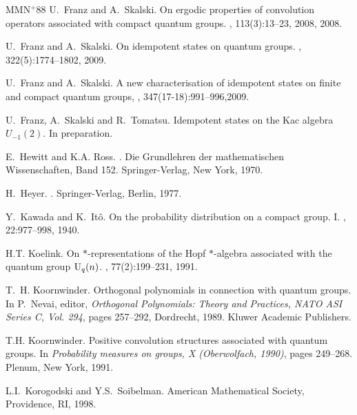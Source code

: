 \documentclass[12pt]{amsart}
\theoremstyle{definition}
\theoremstyle{remark}
\numberwithin{equation}{section}
\begin{document}
\begin{thebibliography}{MMN{{$^{{+}}$}}88}
U.~Franz and A.~Skalski.
\newblock On ergodic properties of convolution operators associated with
  compact quantum groups.
, 113(3):13--23, 2008,
  2008.

U.~Franz and A.~Skalski.
\newblock On idempotent states on quantum groups.
,  322(5):1774--1802, 2009.

U.~Franz and A.~Skalski.
\newblock A new characterisation of idempotent states on finite and compact quantum groups,
, 347(17-18):991--996,2009.

U.~Franz, A.~Skalski and R.~Tomatsu.
\newblock Idempotent states on the Kac algebra $U_{-1}(2)$.
\newblock In preparation.

E.~Hewitt and K.A. Ross.
.
\newblock Die Grundlehren der mathematischen Wissenschaften, Band 152.
  Springer-Verlag, New York, 1970.

H.~Heyer.
.
\newblock Springer-Verlag, Berlin, 1977.

Y.~Kawada and K.~It{\^o}.
\newblock On the probability distribution on a compact group. {I}.
, 22:977--998, 1940.

H.T. Koelink.
\newblock On {$*$}-representations of the {H}opf {$*$}-algebra associated with
  the quantum group {${\rm U}\sb q(n)$}.
, 77(2):199--231, 1991.

T.~H. Koornwinder.
\newblock Orthogonal polynomials in connection with quantum groups.
\newblock In P.~Nevai, editor, {\em Orthogonal Polynomials: Theory and
  Practices, NATO ASI Series C, Vol. 294}, pages 257--292, Dordrecht, 1989.
  Kluwer Academic Publishers.

T.H. Koornwinder.
\newblock Positive convolution structures associated with quantum groups.
\newblock In {\em Probability measures on groups, {X} ({O}berwolfach, 1990)},
  pages 249--268. Plenum, New York, 1991.

L.I.~Korogodski and Y.S.~Soibelman.   American Mathematical Society, Providence, RI, 1998.


\end{thebibliography}
\end{document}
